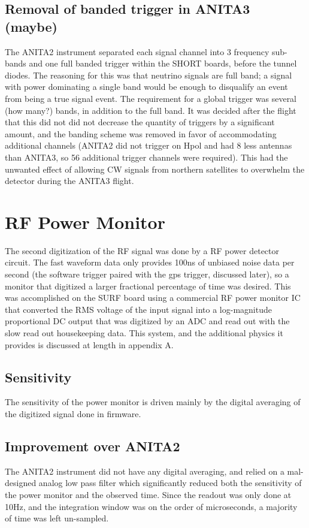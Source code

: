 	\subsection{Removal of banded trigger in ANITA3 (maybe)}
		The ANITA2 instrument separated each signal channel into 3 frequency sub-bands and one full banded trigger within the SHORT boards, before the tunnel diodes.  The reasoning for this was that neutrino signals are full band; a signal with power dominating a single band would be enough to disqualify an event from being a true signal event.  The requirement for a global trigger was several (how many?) bands, in addition to the full band.  It was decided after the flight that this did not did not decrease the quantity of triggers by a significant amount, and the banding scheme was removed in favor of accommodating additional channels (ANITA2 did not trigger on Hpol and had 8 less antennas than ANITA3, so 56 additional trigger channels were required).  This had the unwanted effect of allowing CW signals from northern satellites to overwhelm the detector during the ANITA3 flight.
		
\section{RF Power Monitor}
	The second digitization of the RF signal was done by a RF power detector circuit.  The fast waveform data only provides 100ns of unbiased noise data per second (the software trigger paired with the gps trigger, discussed later), so a monitor that digitized a larger fractional percentage of time was desired.  This was accomplished on the SURF board using a commercial RF power monitor IC that converted the RMS voltage of the input signal into a log-magnitude proportional DC output that was digitized by an ADC and read out with the slow read out housekeeping data.  This system, and the additional physics it provides is discussed at length in appendix A.
	\subsection{Sensitivity}
		The sensitivity of the power monitor is driven mainly by the digital averaging of the digitized signal done in firmware.
	\subsection{Improvement over ANITA2}
		The ANITA2 instrument did not have any digital averaging, and relied on a mal-designed analog low pass filter which significantly reduced both the sensitivity of the power monitor and the observed time.  Since the readout was only done at 10Hz, and the integration window was on the order of microseconds, a majority of time was left un-sampled.
	
